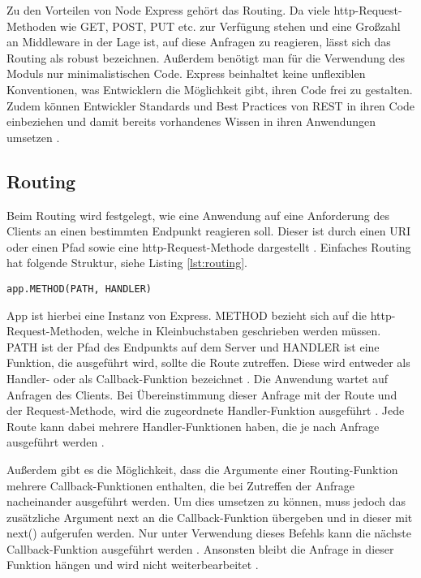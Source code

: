 Zu den Vorteilen von Node Express gehört das Routing. Da viele http-Request-Methoden wie GET, POST, PUT etc. zur Verfügung stehen und eine Großzahl an Middleware in der Lage ist, auf diese Anfragen zu reagieren, lässt sich das Routing als robust bezeichnen. Außerdem benötigt man für die Verwendung des Moduls nur minimalistischen Code. Express beinhaltet keine unflexiblen Konventionen, was Entwicklern die Möglichkeit gibt, ihren Code frei zu gestalten.
Zudem können Entwickler Standards und Best Practices von REST in ihren Code einbeziehen und damit bereits vorhandenes Wissen in ihren Anwendungen umsetzen \cite[S.16f.]{neins}.

\subsection{Routing}

Beim Routing wird festgelegt, wie eine Anwendung auf eine Anforderung des Clients an einen bestimmten Endpunkt reagieren soll. Dieser ist durch einen URI oder einen Pfad sowie eine http-Request-Methode dargestellt \cite{nvier}.
Einfaches Routing hat folgende Struktur, siehe Listing \ref*{lst:routing}.

\begin{lstlisting}[caption={Routing in Express}, label={lst:routing}]
    app.METHOD(PATH, HANDLER)
\end{lstlisting}


App ist hierbei eine Instanz von Express. METHOD bezieht sich auf die http-Request-Methoden, welche in Kleinbuchstaben geschrieben werden müssen. PATH ist der Pfad des Endpunkts auf dem Server und HANDLER ist eine Funktion, die ausgeführt wird, sollte die Route zutreffen. Diese wird entweder als Handler- oder als Callback-Funktion bezeichnet \cite{nvier}.
Die Anwendung wartet auf Anfragen des Clients. Bei Übereinstimmung dieser Anfrage mit der Route und der Request-Methode, wird die zugeordnete Handler-Funktion ausgeführt \cite{nfunf}. Jede Route kann dabei mehrere Handler-Funktionen haben, die je nach Anfrage ausgeführt werden \cite{nvier}.

Außerdem gibt es die Möglichkeit, dass die Argumente einer Routing-Funktion mehrere Callback-Funktionen enthalten, die bei Zutreffen der Anfrage nacheinander ausgeführt werden. Um dies umsetzen zu können, muss jedoch das zusätzliche Argument \glqq next\grqq{} an die Callback-Funktion übergeben und in dieser mit next() aufgerufen werden. Nur unter Verwendung dieses Befehls kann die nächste Callback-Funktion ausgeführt werden \cite{nfunf}. Ansonsten bleibt die Anfrage in dieser Funktion hängen und wird nicht weiterbearbeitet \cite{nsechs}.

